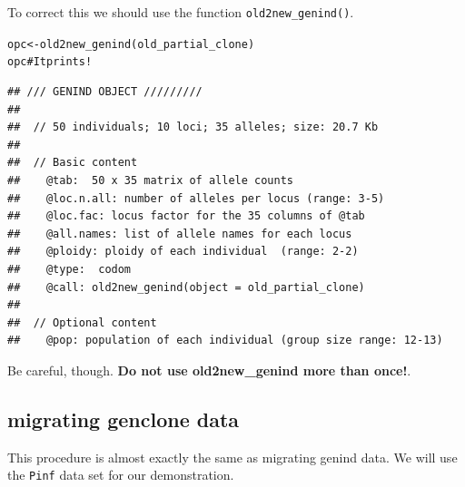 \documentclass[letterpaper]{article}\usepackage[]{graphicx}\usepackage[]{color}
\makeatletter
\newcommand{\hlcom}[1]{\textcolor[rgb]{0.576,0.631,0.631}{#1}}%
\newcommand{\hlstd}[1]{\textcolor[rgb]{0.396,0.482,0.514}{#1}}%
\newcommand{\hlkwb}[1]{\textcolor[rgb]{0.522,0.6,0}{#1}}%
\newcommand{\hlkwd}[1]{\textcolor[rgb]{0.345,0.431,0.459}{#1}}%
\newenvironment{kframe}{%
 \def\at@end@of@kframe{}%
 \ifinner\ifhmode%
  \def\at@end@of@kframe{\end{minipage}}%
  \begin{minipage}{\columnwidth}%
 \fi\fi%
 \def\FrameCommand##1{\hskip\@totalleftmargin \hskip-\fboxsep
 \colorbox{shadecolor}{##1}\hskip-\fboxsep
     \hskip-\linewidth \hskip-\@totalleftmargin \hskip\columnwidth}%
 \MakeFramed {\advance\hsize-\width
   \@totalleftmargin\z@ \linewidth\hsize
   \@setminipage}}%
 {\par\unskip\endMakeFramed%
 \at@end@of@kframe}
\newenvironment{knitrout}{}{} %
\makeatother
\begin{document}
To correct this we should use the function \texttt{old2new\_genind()}.

\begin{knitrout}
\color{fgcolor}\begin{kframe}
\begin{alltt}
\hlstd{opc} \hlkwb{<-} \hlkwd{old2new_genind}\hlstd{(old_partial_clone)}
\hlstd{opc} \hlcom{# It prints!}
\end{alltt}
\begin{verbatim}
## /// GENIND OBJECT /////////
## 
##  // 50 individuals; 10 loci; 35 alleles; size: 20.7 Kb
## 
##  // Basic content
##    @tab:  50 x 35 matrix of allele counts
##    @loc.n.all: number of alleles per locus (range: 3-5)
##    @loc.fac: locus factor for the 35 columns of @tab
##    @all.names: list of allele names for each locus
##    @ploidy: ploidy of each individual  (range: 2-2)
##    @type:  codom
##    @call: old2new_genind(object = old_partial_clone)
## 
##  // Optional content
##    @pop: population of each individual (group size range: 12-13)
\end{verbatim}
\end{kframe}
\end{knitrout}

Be careful, though. \textbf{Do not use old2new\_genind more than once!}.

\subsection{migrating genclone data}

This procedure is almost exactly the same as migrating genind data. We will use
the \texttt{Pinf} data set for our demonstration.
\end{document}
